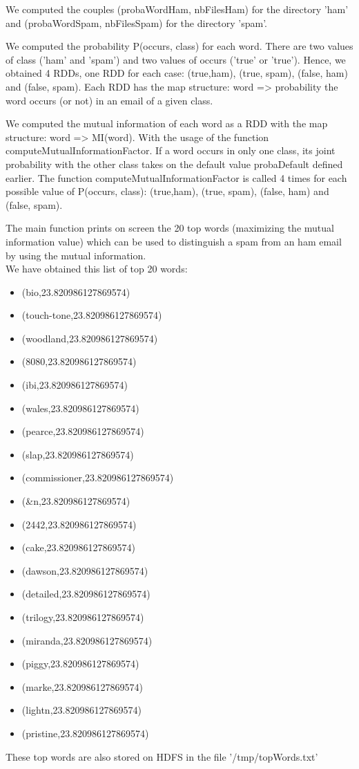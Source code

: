 \documentclass[paper=a4, fontsize=11pt]{scrartcl}
\numberwithin{equation}{section}		%
\numberwithin{figure}{section}			%
\numberwithin{table}{section}				%
\begin{document}
\begin{alphalist}
	\item We computed the couples (probaWordHam, nbFilesHam) for the directory 'ham' and (probaWordSpam, nbFilesSpam) for the directory 'spam'.
	\item We computed the probability P(occurs, class) for each word. There are two values of class ('ham' and 'spam') and two values of occurs ('true' or 'true'). Hence, we obtained 4 RDDs, one RDD for each case: (true,ham), (true, spam), (false, ham) and (false, spam). Each RDD has the map structure: word => probability the word occurs (or not) in an email of a given class.
	\item We computed the mutual information of each word as a RDD with the map structure: word => MI(word). With the usage of the function	computeMutualInformationFactor. If a word occurs in only one class, its	joint probability with the other class takes on the default value probaDefault defined earlier.	The function computeMutualInformationFactor is called 4 times for each possible value of P(occurs, class): (true,ham), (true, spam), (false, ham) and (false, spam).
	\item The main function  prints on screen the 20 top words (maximizing the mutual information value) which can be used to distinguish a spam from an ham email by using the mutual information. \\

We have obtained this list of top 20 words: \\
      \begin{itemize}
\item (bio,23.820986127869574)
\item (touch-tone,23.820986127869574)
\item (woodland,23.820986127869574)
\item (8080,23.820986127869574)
\item (ibi,23.820986127869574)
\item (wales,23.820986127869574)
\item (pearce,23.820986127869574)
\item (slap,23.820986127869574)
\item (commissioner,23.820986127869574)
\item (&n,23.820986127869574)
\item (2442,23.820986127869574)
\item (cake,23.820986127869574)
\item (dawson,23.820986127869574)
\item (detailed,23.820986127869574)
\item (trilogy,23.820986127869574)
\item (miranda,23.820986127869574)
\item (piggy,23.820986127869574)
\item (marke,23.820986127869574)
\item (lightn,23.820986127869574)
\item (pristine,23.820986127869574)
     
      \end{itemize}
	\item These top words are also stored on HDFS in the file
	'/tmp/topWords.txt'
\end{alphalist}
\end{document}
